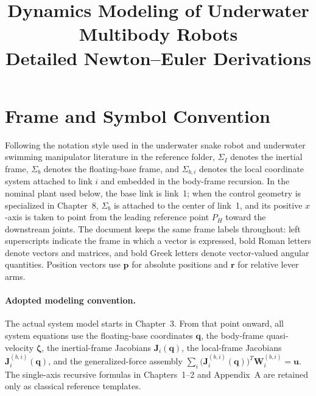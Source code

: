 \documentclass[12pt,a4paper]{report}
\title{Dynamics Modeling of Underwater Multibody Robots\\Detailed Newton--Euler Derivations}
\author{}
\date{}
\newcommand{\vect}[1]{\mathbf{#1}}
\newcommand{\Frame}[1]{\Sigma_{#1}}
\begin{document}
\maketitle
\tableofcontents
\newpage
\setcounter{equation}{0}
\renewcommand{\theequation}{P.\arabic{equation}}

\section*{Frame and Symbol Convention}

Following the notation style used in the underwater snake robot and underwater swimming manipulator literature in the reference folder, $\Frame{I}$ denotes the inertial frame, $\Frame{b}$ denotes the floating-base frame, and $\Frame{b,i}$ denotes the local coordinate system attached to link $i$ and embedded in the body-frame recursion. In the nominal plant used below, the base link is link~1; when the control geometry is specialized in Chapter~8, $\Frame{b}$ is attached to the center of link~1, and its positive $x$-axis is taken to point from the leading reference point $P_H$ toward the downstream joints. The document keeps the same frame labels throughout: left superscripts indicate the frame in which a vector is expressed, bold Roman letters denote vectors and matrices, and bold Greek letters denote vector-valued angular quantities. Position vectors use $\vect{p}$ for absolute positions and $\vect{r}$ for relative lever arms.

\paragraph{Adopted modeling convention.}
The actual system model starts in Chapter~3. From that point onward, all system equations use the floating-base coordinates $\mathbf{q}$, the body-frame quasi-velocity $\boldsymbol{\zeta}$, the inertial-frame Jacobians $\mathbf{J}_i(\mathbf{q})$, the local-frame Jacobians $\mathbf{J}_i^{(b,i)}(\mathbf{q})$, and the generalized-force assembly $\sum_i\bigl(\mathbf{J}_i^{(b,i)}(\mathbf{q})\bigr)^T\mathbf{W}_i^{(b,i)}=\mathbf{u}$. The single-axis recursive formulas in Chapters~1--2 and Appendix~A are retained only as classical reference templates.
\end{document}
